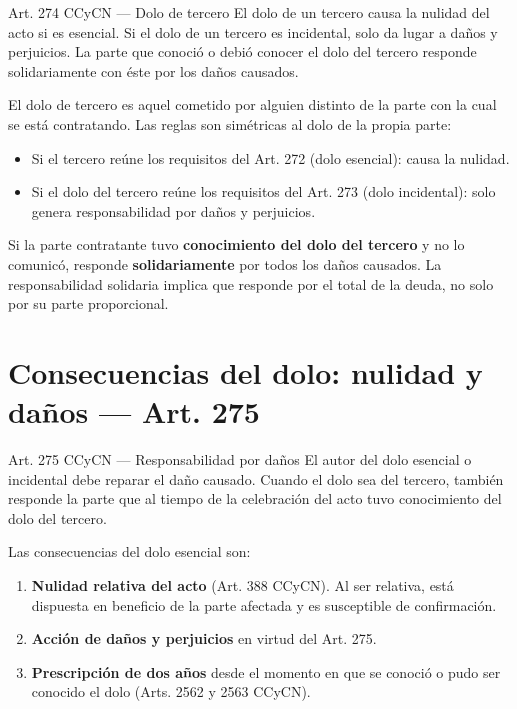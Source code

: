 \documentclass[12pt,oneside]{book}
\begin{document}
\begin{articulo}{Art. 274 CCyCN --- Dolo de tercero}
El dolo de un tercero causa la nulidad del acto si es esencial. Si el dolo de un tercero es incidental, solo da lugar a daños y perjuicios. La parte que conoció o debió conocer el dolo del tercero responde solidariamente con éste por los daños causados.
\end{articulo}

El dolo de tercero es aquel cometido por alguien distinto de la parte con la cual se está contratando. Las reglas son simétricas al dolo de la propia parte:

\begin{itemize}
    \item Si el tercero reúne los requisitos del Art. 272 (dolo esencial): causa la nulidad.
    \item Si el dolo del tercero reúne los requisitos del Art. 273 (dolo incidental): solo genera responsabilidad por daños y perjuicios.
\end{itemize}

Si la parte contratante tuvo \textbf{conocimiento del dolo del tercero} y no lo comunicó, responde \textbf{solidariamente} por todos los daños causados. La responsabilidad solidaria implica que responde por el total de la deuda, no solo por su parte proporcional.

\section{Consecuencias del dolo: nulidad y daños --- Art. 275}

\begin{articulo}{Art. 275 CCyCN --- Responsabilidad por daños}
El autor del dolo esencial o incidental debe reparar el daño causado. Cuando el dolo sea del tercero, también responde la parte que al tiempo de la celebración del acto tuvo conocimiento del dolo del tercero.
\end{articulo}

Las consecuencias del dolo esencial son:

\begin{enumerate}
    \item \textbf{Nulidad relativa del acto} (Art. 388 CCyCN). Al ser relativa, está dispuesta en beneficio de la parte afectada y es susceptible de confirmación.
    \item \textbf{Acción de daños y perjuicios} en virtud del Art. 275.
    \item \textbf{Prescripción de dos años} desde el momento en que se conoció o pudo ser conocido el dolo (Arts. 2562 y 2563 CCyCN).
\end{enumerate}
\end{document}
